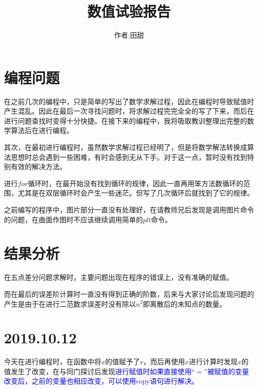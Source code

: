 \documentclass[12pt,a4paper]{article}
\title{数值试验报告}
\author{作者:田甜}
\date{\chntoday}
\begin{document}
\maketitle
\newpage
\section{编程问题}
在之前几次的编程中，只是简单的写出了数学求解过程，因此在编程时导致赋值时产生混乱。因此在最后一次寻找问题时，将求解过程完完全全的写了下来，而后在进行问题查找时变得十分快捷。在接下来的编程中，我将吸取教训整理出完整的数学算法后在进行编程。

其次，在最初进行编程时，虽然数学求解过程已经明了，但是将数学解法转换成算法思想时总会遇到一些困难，有时会感到无从下手。对于这一点，暂时没有找到特别有效的解决方法。

进行$for$循环时，在最开始没有找到循环的规律，因此一直再用笨方法数循环的范围，尤其是在双层循环时会产生一些迷茫。但写了几次循环后就找到了它的规律。

之前编写的程序中，图片部分一直没有处理好，在请教师兄后发现是调用图片命令的问题，在曲面作图时不应该继续调用简单的$plt$命令。
\section{结果分析}
在五点差分问题求解时，主要问题出现在程序的错误上，没有准确的赋值。

而在最后的误差阶计算时一直没有得到正确的阶数，后来与大家讨论后发现问题的产生是由于在进行二范数求误差时没有除以$n^2$即离散后的未知点的数量。

\section{2019.10.12}
今天在进行编程时，在函数中将$x$的值赋予了$v$，而后再使用$x$进行计算时发现$x$的值发生了改变，在与同门探讨后发现\textcolor{blue}{进行赋值时如果直接使用$“=”$被赋值的变量改变后，之前的变量也相应改变，可以使用copy语句进行解决。}
\end{document}
